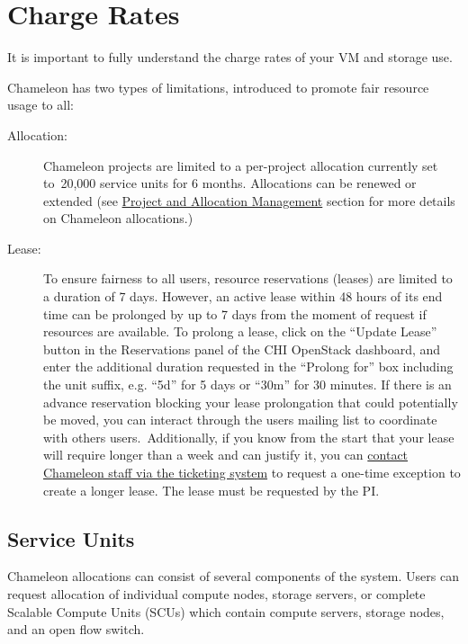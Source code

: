 \section{Charge Rates}
\label{C:cc-charge}

It is important to fully understand the charge rates of your VM and storage use.

Chameleon has two types of limitations, introduced to promote fair resource
usage to all:~

\begin{description}

\item  [Allocation:] Chameleon projects are limited to a per-project allocation
  currently set to~20,000 service units for 6 months. Allocations can be
  renewed or extended (see
  \href{index.html\#toc-project-and-allocation-management}{Project and
  Allocation Management} section for more details on Chameleon
allocations.)

  \item [Lease:] To ensure fairness to all users, resource reservations (leases)
  are limited to a duration of 7 days. However, an active lease within
  48 hours of its end time can be prolonged by up to 7 days from the
  moment of request if resources are available. To prolong a lease,
  click on the ``Update Lease'' button in the Reservations panel of the
  CHI OpenStack dashboard, and enter the additional duration requested
  in the ``Prolong for'' box including the unit suffix, e.g. ``5d'' for
  5 days or ``30m'' for 30 minutes. If there is an advance reservation
  blocking your lease prolongation that could potentially be moved,
  you can interact through the users mailing list to coordinate with
  others  users.~Additionally, if you know from the start that your
  lease will  require longer than a week and can justify it, you can
  \href{https://www.chameleoncloud.org/user/help/ticket/new/}{contact
    Chameleon staff via the ticketing system} to request a one-time
  exception to create a longer lease. The lease must be requested by
  the PI.

\end{description}

\subsection{Service Units}

Chameleon allocations can consist of several components of the system.
Users can request allocation of individual compute nodes, storage
servers, or complete Scalable Compute Units (SCUs) which contain compute
servers, storage nodes, and an open flow switch.

